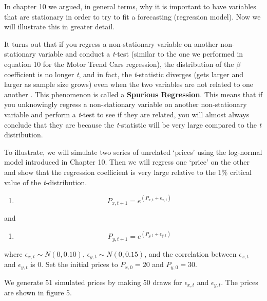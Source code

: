 \documentclass[]{book}
\providecommand{\tightlist}{%
  \setlength{\itemsep}{0pt}\setlength{\parskip}{0pt}}
\theoremstyle{definition}
\theoremstyle{definition}
\theoremstyle{remark}
\begin{document}
In chapter 10 we argued, in general terms, why it is important to have
variables that are stationary in order to try to fit a forecasting
(regression model). Now we will illustrate this in greater detail.

It turns out that if you regress a non-stationary variable on another
non-stationary variable and conduct a \emph{t}-test (similar to the one
we performed in equation 10 for the Motor Trend Cars regression), the
distribution of the \(\beta\) coefficient is no longer \emph{t}, and in
fact, the \emph{t}-statistic diverges (gets larger and larger as sample
size grows) even when the two variables are not related to one another
\citep{granger1974spurious}. This phenomenon is called a
\textbf{Spurious Regression}. This means that if you unknowingly regress
a non-stationary variable on another non-stationary variable and perform
a \emph{t}-test to see if they are related, you will almost always
conclude that they are because the \emph{t}-statistic will be very large
compared to the \emph{t} distribution.

To illustrate, we will simulate two series of unrelated `prices' using
the log-normal model introduced in Chapter 10. Then we will regress one
`price' on the other and show that the regression coefficient is very
large relative to the 1\% critical value of the \emph{t}-distribution.

\begin{enumerate}
\def\labelenumi{\arabic{enumi}.}
\setcounter{enumi}{11}
\tightlist
\item
  \[P_{x,t+1} = e^{(P_{x,t} + \epsilon_{x,t})}\]
\end{enumerate}

and

\begin{enumerate}
\def\labelenumi{\arabic{enumi}.}
\setcounter{enumi}{12}
\tightlist
\item
  \[P_{y,t+1} = e^{(P_{y,t} + \epsilon_{y,t})}\]
\end{enumerate}

where \(\epsilon_{x,t} \sim N(0, 0.10)\),
\(\epsilon_{y,t} \sim N(0, 0.15)\), and the correlation between
\(\epsilon_{x,t}\) and \(\epsilon_{y,t}\) is 0. Set the initial prices
to \(P_{x,0} = 20\) and \(P_{y,0} = 30\).

We generate 51 simulated prices by making 50 draws for
\(\epsilon_{x,t}\) and \(\epsilon_{y,t}\). The prices are shown in
figure 5.
\end{document}
